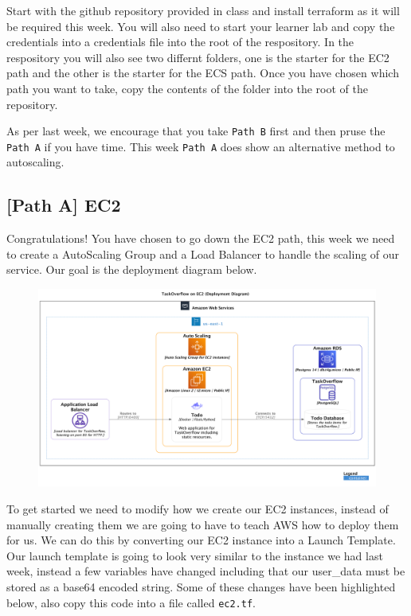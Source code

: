 \documentclass{csse4400}
\begin{document}
Start with the github repository provided in class and install terraform as it will be required this week. You will also need to start your learner lab and copy the credentials into a credentials file into the root of the respository. In the respository you will also see two differnt folders, one is the starter for the EC2 path and the other is the starter for the ECS path. Once you have chosen which path you want to take, copy the contents of the folder into the root of the repository.

As per last week, we encourage that you take \texttt{Path B} first and then pruse the \texttt{Path A} if you have time. This week \texttt{Path A} does show an alternative method to autoscaling.

\subsection{[Path A] EC2}

Congratulations! You have chosen to go down the EC2 path, this week we need to create a AutoScaling Group and a Load Balancer to handle the scaling of our service. Our goal is the deployment diagram below.

\begin{figure}[H]
  \includegraphics[width=\textwidth]{diagrams/ec2deployment}
\end{figure}

To get started we need to modify how we create our EC2 instances, instead of manually creating them we are going to have to teach AWS how to deploy them for us. We can do this by converting our EC2 instance into a Launch Template. Our launch template is going to look very similar to the instance we had last week, instead a few variables have changed including that our user\_data must be stored as a base64 encoded string. Some of these changes have been highlighted below, also copy this code into a file called \texttt{ec2.tf}.
\end{document}
